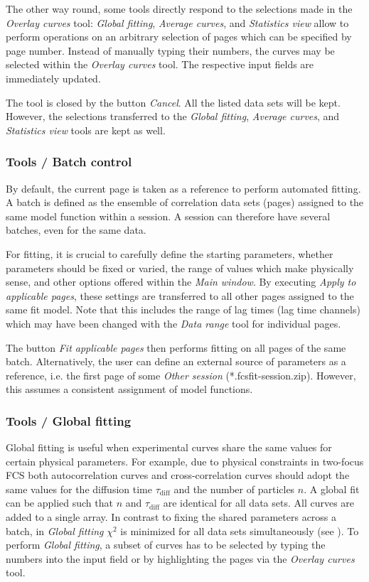 The other way round, some tools directly respond to the selections made in the \textit{Overlay curves} tool: \textit{Global fitting}, \textit{Average curves}, and \textit{Statistics view} allow to perform operations on an arbitrary selection of pages which can be specified by page number. Instead of manually typing their numbers, the curves may be selected within the \textit{Overlay curves} tool. The respective input fields are immediately updated.

The tool is closed by the button \textit{Cancel}. All the listed data sets will be kept. However, the selections transferred to the \textit{Global fitting}, \textit{Average curves}, and \textit{Statistics view} tools are kept as well.

\subsubsection{Tools / Batch control}
\label{sec:menub.tools.batch}
By default, the current page is taken as a reference to perform automated fitting. A batch is defined as the ensemble of correlation data sets (pages) assigned to the same model function within a session. A session can therefore have several batches, even for the same data. 

For fitting, it is crucial to carefully define the starting parameters, whether parameters should be fixed or varied, the range of values which make physically sense, and other options offered within the \textit{Main window}. By executing \textit{Apply to applicable pages}, these settings are transferred to all other pages assigned to the same fit model. Note that this includes the range of lag times (lag time channels) which may have been changed with the \textit{Data range }tool for individual pages.

The button \textit{Fit applicable pages} then performs fitting on all pages of the same batch. Alternatively, the user can define an external source of parameters as a reference, i.e. the first page of some \textit{Other session} (*.fcsfit-session.zip). However, this assumes a consistent assignment of model functions.

\subsubsection{Tools / Global fitting}
\label{sec:menub.tools.globa}
Global fitting is useful when experimental curves share the same values for certain physical parameters. For example, due to physical constraints in two-focus FCS both autocorrelation curves and  cross-correlation curves should adopt the same values for the diffusion time $\tau_\mathrm{diff}$ and the number of particles $n$. A global fit can be applied such that $n$ and $\tau_\mathrm{diff}$ are identical for all data sets. All curves are added to a single array. In contrast to fixing the shared parameters across a batch, in \textit{Global fitting} $\chi^2$  is minimized for all data sets simultaneously (see ). To perform \textit{Global fitting}, a subset of curves has to be selected by typing the numbers into the input field or by highlighting the pages via the \textit{Overlay curves} tool. 

